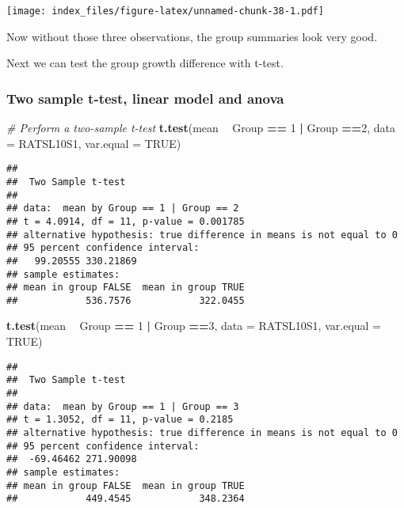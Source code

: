 \documentclass[]{article}
\newenvironment{Shaded}{\begin{snugshade}}{\end{snugshade}}
\newcommand{\KeywordTok}[1]{\textcolor[rgb]{0.13,0.29,0.53}{\textbf{#1}}}
\newcommand{\DataTypeTok}[1]{\textcolor[rgb]{0.13,0.29,0.53}{#1}}
\newcommand{\DecValTok}[1]{\textcolor[rgb]{0.00,0.00,0.81}{#1}}
\newcommand{\StringTok}[1]{\textcolor[rgb]{0.31,0.60,0.02}{#1}}
\newcommand{\CommentTok}[1]{\textcolor[rgb]{0.56,0.35,0.01}{\textit{#1}}}
\newcommand{\OtherTok}[1]{\textcolor[rgb]{0.56,0.35,0.01}{#1}}
\newcommand{\OperatorTok}[1]{\textcolor[rgb]{0.81,0.36,0.00}{\textbf{#1}}}
\newcommand{\NormalTok}[1]{#1}
\begin{document}
\texttt{[image: index\_files/figure-latex/unnamed-chunk-38-1.pdf]}

Now without those three observations, the group summaries look very
good.

Next we can test the group growth difference with t-test.

\subsubsection{Two sample t-test, linear model and
anova}\label{two-sample-t-test-linear-model-and-anova}

\begin{Shaded}
\begin{Highlighting}[]
\CommentTok{# Perform a two-sample t-test}
\KeywordTok{t.test}\NormalTok{(mean }\OperatorTok{~}\StringTok{ }\NormalTok{Group }\OperatorTok{==}\StringTok{ }\DecValTok{1}  \OperatorTok{|}\StringTok{ }\NormalTok{Group }\OperatorTok{==}\DecValTok{2}\NormalTok{, }\DataTypeTok{data =}\NormalTok{ RATSL10S1, }\DataTypeTok{var.equal =} \OtherTok{TRUE}\NormalTok{)}
\end{Highlighting}
\end{Shaded}

\begin{verbatim}
## 
##  Two Sample t-test
## 
## data:  mean by Group == 1 | Group == 2
## t = 4.0914, df = 11, p-value = 0.001785
## alternative hypothesis: true difference in means is not equal to 0
## 95 percent confidence interval:
##   99.20555 330.21869
## sample estimates:
## mean in group FALSE  mean in group TRUE 
##            536.7576            322.0455
\end{verbatim}

\begin{Shaded}
\begin{Highlighting}[]
\KeywordTok{t.test}\NormalTok{(mean }\OperatorTok{~}\StringTok{ }\NormalTok{Group }\OperatorTok{==}\StringTok{ }\DecValTok{1}  \OperatorTok{|}\StringTok{ }\NormalTok{Group }\OperatorTok{==}\DecValTok{3}\NormalTok{, }\DataTypeTok{data =}\NormalTok{ RATSL10S1, }\DataTypeTok{var.equal =} \OtherTok{TRUE}\NormalTok{)}
\end{Highlighting}
\end{Shaded}

\begin{verbatim}
## 
##  Two Sample t-test
## 
## data:  mean by Group == 1 | Group == 3
## t = 1.3052, df = 11, p-value = 0.2185
## alternative hypothesis: true difference in means is not equal to 0
## 95 percent confidence interval:
##  -69.46462 271.90098
## sample estimates:
## mean in group FALSE  mean in group TRUE 
##            449.4545            348.2364
\end{verbatim}
\end{document}
